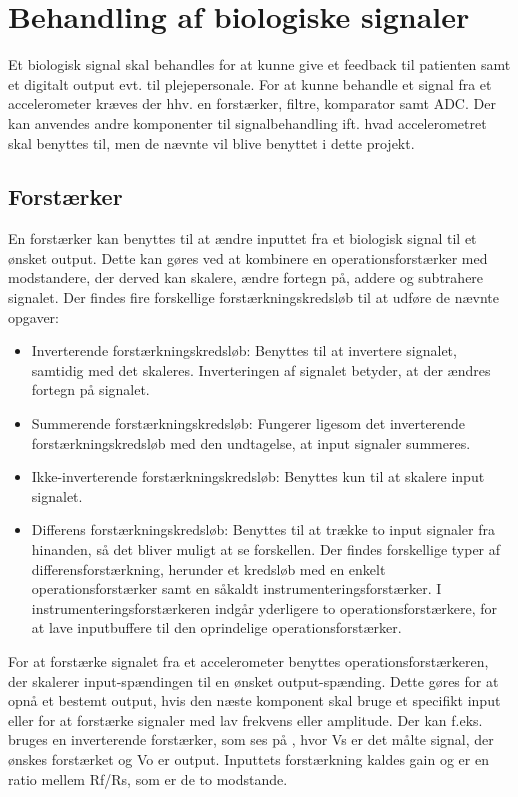 \section{Behandling af biologiske signaler}
Et biologisk signal skal behandles for at kunne give et feedback til patienten samt et digitalt output evt. til plejepersonale. For at kunne behandle et signal fra et accelerometer kræves der hhv. en forstærker, filtre, komparator samt ADC. Der kan anvendes andre komponenter til signalbehandling ift. hvad accelerometret skal benyttes til, men de nævnte vil blive benyttet i dette projekt. 

\subsection{Forstærker}\label{forstaerkerafsnit}
En forstærker kan benyttes til at ændre inputtet fra et biologisk signal til et ønsket output. Dette kan gøres ved at kombinere en operationsforstærker med modstandere, der derved kan skalere, ændre fortegn på, addere og subtrahere signalet. Der findes fire forskellige forstærkningskredsløb til at udføre de nævnte opgaver: \cite{Nilsson2011}
\begin{itemize}
\item Inverterende forstærkningskredsløb: Benyttes til at invertere signalet, samtidig med det skaleres. Inverteringen af signalet betyder, at der ændres fortegn på signalet.
\item Summerende forstærkningskredsløb: Fungerer ligesom det inverterende forstærkningskredsløb med den undtagelse, at input signaler summeres.
\item Ikke-inverterende forstærkningskredsløb: Benyttes kun til at skalere input signalet.
\item Differens forstærkningskredsløb: Benyttes til at trække to input signaler fra hinanden, så det bliver muligt at se forskellen\cite{Nilsson2011}. Der findes forskellige typer af differensforstærkning, herunder et kredsløb med en enkelt operationsforstærker samt en såkaldt instrumenteringsforstærker. I instrumenteringsforstærkeren indgår yderligere to operationsforstærkere, for at lave inputbuffere til den oprindelige operationsforstærker.\cite{Sedra2010}  
\end{itemize} 

For at forstærke signalet fra et accelerometer benyttes operationsforstærkeren, der skalerer input-spændingen til en ønsket output-spænding. Dette gøres for at opnå et bestemt output, hvis den næste komponent skal bruge et specifikt input eller for at forstærke signaler med lav frekvens eller amplitude. Der kan f.eks. bruges en inverterende forstærker, som ses på , hvor Vs er det målte signal, der ønskes forstærket og Vo er output. Inputtets forstærkning kaldes gain og er en ratio mellem Rf/Rs, som er de to modstande. \cite{Nilsson2011}

